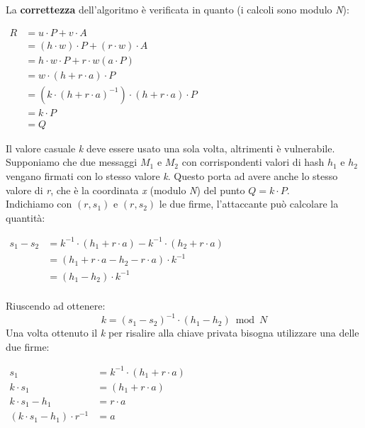 \newpage
La \textbf{correttezza} dell'algoritmo è verificata in quanto (i calcoli sono modulo \textit{N}):
\begin{center}
    \begin{math}
        \begin{aligned}
            R &= u \cdot P + v \cdot A \\
            &= (h \cdot w) \cdot P + (r \cdot w) \cdot A \\
            &= h \cdot w \cdot P + r \cdot w(a \cdot P) \\
            &= w \cdot (h + r \cdot a) \cdot P \\
            &= (k \cdot (h + r \cdot a)^{-1}) \cdot (h + r \cdot a) \cdot P \\
            &= k \cdot P \\
            &= Q
        \end{aligned}
    \end{math}
\end{center}
Il valore casuale \textit{k} deve essere usato una sola volta, altrimenti è vulnerabile. Supponiamo che due messaggi $M_1 \text{ e } M_2$ con corrispondenti valori di hash $h_1 \text{ e } h_2$ vengano firmati con lo stesso valore \textit{k}. Questo porta ad avere anche lo stesso valore di \textit{r}, che è la coordinata \textit{x} (modulo \textit{N}) del punto $Q = k \cdot P$. \\
Indichiamo con $(r, s_1)$ e $(r, s_2)$ le due firme, l'attaccante può calcolare la quantità:
\begin{center}
    \begin{math}
        \begin{aligned}
            s_1 - s_2 &= k^{-1} \cdot (h_1 + r \cdot a) - k^{-1} \cdot (h_2 + r \cdot a) \\
            &= (h_1 + r \cdot a - h_2 - r \cdot a) \cdot k^{-1} \\
            &= (h_1 - h_2) \cdot k^{-1} \\
        \end{aligned}
    \end{math}
\end{center}
Riuscendo ad ottenere:
$$k = (s_1 - s_2)^{-1} \cdot (h_1 - h_2) \bmod N$$
Una volta ottenuto il \textit{k} per risalire alla chiave privata bisogna utilizzare una delle due firme:
\begin{center}
    \begin{math}
        \begin{aligned}
            s_1 &= k^{-1} \cdot (h_1 + r \cdot a) \\
            k \cdot s_1 &= (h_1 + r \cdot a) \\
            k \cdot s_1 - h_1 &= r \cdot a \\
            (k \cdot s_1 - h_1) \cdot r^{-1} &= a
        \end{aligned}
    \end{math}
\end{center}